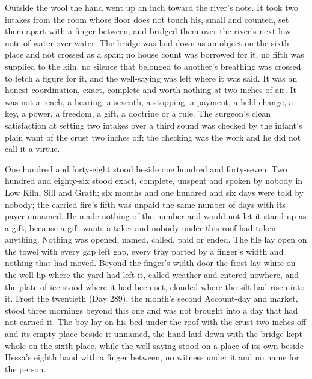 Outside the wool the hand went up an inch toward the river's note. It took two intakes from the room whose floor does not touch his, small and counted, set them apart with a finger between, and bridged them over the river's next low note of water over water. The bridge was laid down as an object on the sixth place and not crossed as a span; no house count was borrowed for it, no fifth was supplied to the kiln, no silence that belonged to another's breathing was crossed to fetch a figure for it, and the well-saying was left where it was said. It was an honest coordination, exact, complete and worth nothing at two inches of air. It was not a reach, a hearing, a seventh, a stopping, a payment, a held change, a key, a power, a freedom, a gift, a doctrine or a rule. The surgeon's clean satisfaction at setting two intakes over a third sound was checked by the infant's plain want of the crust two inches off; the checking was the work and he did not call it a virtue.

One hundred and forty-eight stood beside one hundred and forty-seven. Two hundred and eighty-six stood exact, complete, unspent and spoken by nobody in Low Kiln, Sill and Grath; six months and one hundred and six days were told by nobody; the carried fire's fifth was unpaid the same number of days with its payer unnamed. He made nothing of the number and would not let it stand up as a gift, because a gift wants a taker and nobody under this roof had taken anything. Nothing was opened, named, called, paid or ended. The file lay open on the towel with every gap left gap, every tray parted by a finger's width and nothing that had moved. Beyond the finger's-width door the frost lay white on the well lip where the yard had left it, called weather and entered nowhere, and the plate of ice stood where it had been set, clouded where the silt had risen into it. Frost the twentieth (Day 289), the month's second Account-day and market, stood three mornings beyond this one and was not brought into a day that had not earned it. The boy lay on his bed under the roof with the crust two inches off and its empty place beside it unnamed, the hand laid down with the bridge kept whole on the sixth place, while the well-saying stood on a place of its own beside Hessa's eighth hand with a finger between, no witness under it and no name for the person.
